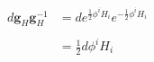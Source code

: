 \begin{equation}
\begin{aligned}
d\mathbf{g}_{H}\mathbf{g}_{H}^{-1}&= de^{\frac{1}{2}\phi
^{i}H_{i}}e^{-\frac{1}{2}\phi ^{i}H_{i}}\\
\\
&=\frac{1}{2}d\phi ^{i}H_{i}
\end{aligned}
\end{equation}

